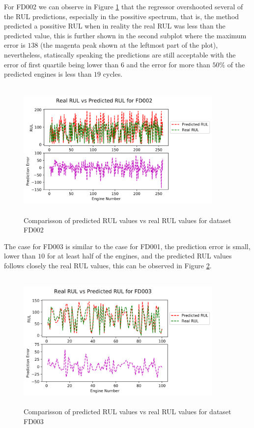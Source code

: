 \documentclass[preprint,12pt]{elsarticle}%
\begin{document}
For FD002 we can observe in Figure \ref{Fig:rul_plots_dataset_2} that the regressor overshooted several of the RUL predictions, especially in the possitive spectrum, that is, the method predicted a possitive RUL when in reality the real RUL was less than the predicted value, this is further shown in the second subplot where the maximum error is $138$ (the magenta peak shown at the leftmost part of the plot), nevertheless, statiscally speaking the predictions are still acceptable with the error of first quartile being lower than $6$ and the error for more than $50\%$ of the predicted engines is less than $19$ cycles. 

\begin{figure}[!htb]
\begin{center}
\includegraphics[height=2.7in, width=4in]{Figures/rul_plots_dataset_2.png}
\caption{Comparisson of predicted RUL values vs real RUL values for dataset FD002}
\label{Fig:rul_plots_dataset_2}
\end{center}
\end{figure}

The case for FD003 is similar to the case for FD001, the prediction error is small, lower than $10$ for at least half of the engines, and the predicted RUL values follows closely the real RUL values, this can be observed in Figure \ref{Fig:rul_plots_dataset_3}. 

\begin{figure}[!htb]
\begin{center}
\includegraphics[height=2.7in, width=4in]{Figures/rul_plots_dataset_3.png}
\caption{Comparisson of predicted RUL values vs real RUL values for dataset FD003}
\label{Fig:rul_plots_dataset_3}
\end{center}
\end{figure}
\end{document}
